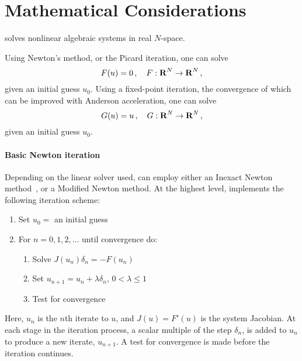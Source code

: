\chapter{Mathematical Considerations}\label{s:math}

{\kinsol} solves nonlinear algebraic systems in real $N$-space.

Using Newton's method, or the Picard iteration, one can solve
\begin{equation}\label{nonlinear_system}
  F(u) = 0 \, , \quad F:\mbox{\bf R}^N \rightarrow \mbox{\bf R}^N \, ,
\end{equation}
given an initial guess $u_0$.
Using a fixed-point iteration, the convergence of which can be improved with Anderson
acceleration, one can solve
\begin{equation}\label{fixed-point_system}
  G(u) = u \, , \quad G:\mbox{\bf R}^N \rightarrow \mbox{\bf R}^N \, ,
\end{equation}
given an initial guess $u_0$.



\subsubsection*{Basic Newton iteration}
Depending on the linear solver used, {\kinsol} can employ either an Inexact Newton
method~\cite{Bro:87,BrSa:90,DES:82,DeSc:96,Kel:95}, or a Modified Newton method.
At the highest level, {\kinsol} implements the following iteration scheme:

\vspace{1ex}
\begin{enumerate}
   \item Set $u_0 = $ an initial guess
   \item For $n = 0, 1, 2,...$ until convergence do:
      \begin{enumerate}
          \item Solve $J(u_n)\delta_n = -F(u_n)$\label{e:Newton}
          \item Set $u_{n+1} = u_n + \lambda \delta_n$,
          $0 < \lambda \leq 1$
          \item Test for convergence
      \end{enumerate}
\end{enumerate}
Here, $u_n$ is the $n$th iterate to $u$, and $J(u) = F'(u)$ is the system
Jacobian. At each stage in the iteration process, a scalar multiple of the
step $\delta_n$, is added to $u_n$ to produce a new iterate, $u_{n+1}$.
A test for convergence is made before the iteration continues.


